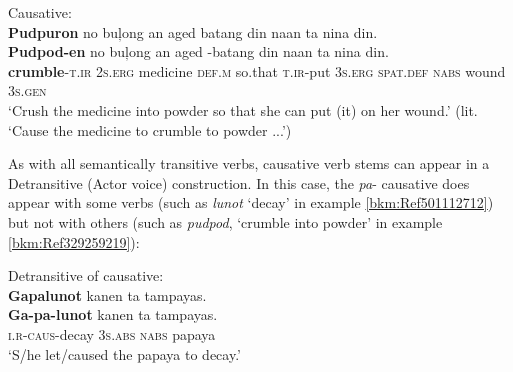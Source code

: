 \ea
\label{bkm:Ref501112294} \label{ex:onthewound}
Causative: \\
\textbf{Pudpuron} no buļong an aged batang din naan ta nina din. \\\smallskip
\gll \textbf{Pudpod-en}  no  buļong an aged \emptyset{}-batang din naan ta nina din. \\
\textbf{crumble}-\textsc{t.ir}  2\textsc{s.erg}  medicine \textsc{def.m} so.that \textsc{t.ir}-put  3\textsc{s.erg}   \textsc{spat.def} \textsc{nabs} wound  3\textsc{s.gen} \\
\glt `Crush the medicine into powder so that she can put (it) on her wound.' (lit. `Cause the medicine to crumble to powder ...’)
\z




As with all semantically transitive verbs, causative verb stems can appear in a Detransitive (Actor voice) construction. In this case, the \textit{pa}{}- causative does appear with some verbs (such as \textit{lunot} `decay' in example \ref{bkm:Ref501112712}) but not with others (such as \textit{pudpod}, ‘crumble into powder’ in example \ref{bkm:Ref329259219}):

\ea
\label{bkm:Ref501112712}
Detransitive of causative: \\
\textbf{Gapalunot}  kanen  ta  tampayas.  \\\smallskip
\gll \textbf{Ga-pa-lunot}  kanen  ta  tampayas.  \\
\textsc{i.r}-\textsc{caus}-decay  3\textsc{s.abs}  \textsc{nabs}  papaya \\
\glt ‘S/he let/caused the papaya to decay.’ \\
\z

